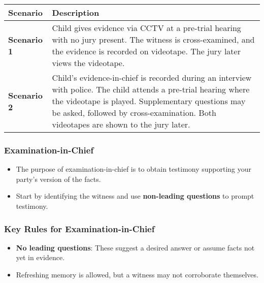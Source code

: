 \begin{longtable}[]{@{}
  >{\raggedright\arraybackslash}p{}
  >{\raggedright\arraybackslash}p{}@{}}
\toprule\noalign{}
\begin{minipage}[b]{\linewidth}\raggedright
Scenario
\end{minipage} & \begin{minipage}[b]{\linewidth}\raggedright
Description
\end{minipage} \\
\midrule\noalign{}
\endhead
\bottomrule\noalign{}
\endlastfoot
\textbf{Scenario 1} & Child gives evidence via CCTV at a pre-trial
hearing with no jury present. The witness is cross-examined, and the
evidence is recorded on videotape. The jury later views the
videotape. \\
\textbf{Scenario 2} & Child's evidence-in-chief is recorded during an
interview with police. The child attends a pre-trial hearing where the
videotape is played. Supplementary questions may be asked, followed by
cross-examination. Both videotapes are shown to the jury later. \\
\end{longtable}

\subsubsection{Examination-in-Chief}\label{examination-in-chief}

\begin{itemize}
\tightlist
\item
  The purpose of examination-in-chief is to obtain testimony supporting
  your party's version of the facts.
\item
  Start by identifying the witness and use \textbf{non-leading
  questions} to prompt testimony.
\end{itemize}

\subsubsection{Key Rules for
Examination-in-Chief}\label{key-rules-for-examination-in-chief}

\begin{itemize}
\tightlist
\item
  \textbf{No leading questions}: These suggest a desired answer or
  assume facts not yet in evidence.
\item
  Refreshing memory is allowed, but a witness may not corroborate
  themselves.
\end{itemize}

